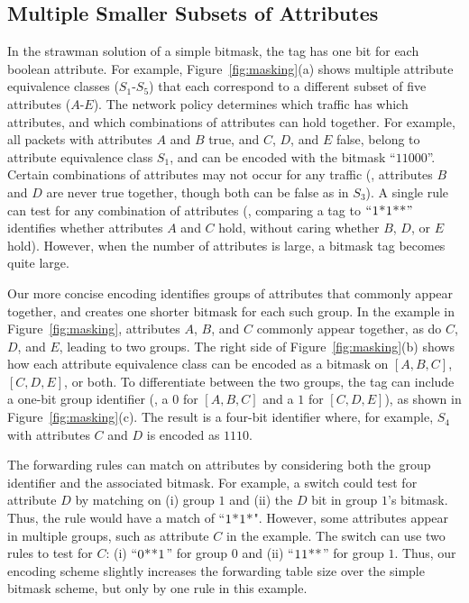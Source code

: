 \subsection{Multiple Smaller Subsets of Attributes}
\label{ssec:mset}
In the strawman solution of a simple bitmask, the tag has one bit for
each boolean attribute.  For example, Figure~\ref{fig:masking}(a)
shows multiple attribute equivalence classes ($S_1$-$S_5$) that each
correspond to a different subset of five attributes ($A$-$E$).  The
network policy determines which traffic has which attributes, and
which combinations of attributes can hold together.  For example, all
packets with attributes $A$ and $B$ true, and $C$, $D$, and $E$ false,
belong to attribute equivalence class $S_1$, and can be encoded with
the bitmask ``$11000$''.  Certain combinations of attributes may not
occur for any traffic (\eg, attributes $B$ and $D$ are never true
together, though both can be false as in $S_3$).  A single rule can
test for any combination of attributes (\eg, comparing a tag to
$\textsc{``1*1**''}$ identifies whether attributes $A$ and $C$ hold, without
caring whether $B$, $D$, or $E$ hold).  However, when the number of
attributes is large, a bitmask tag becomes quite large.

Our more concise encoding identifies groups of attributes that
commonly appear together, and creates one shorter bitmask for each
such group.  In the example in Figure~\ref{fig:masking}, attributes
$A$, $B$, and $C$ commonly appear together, as do $C$, $D$, and $E$,
leading to two groups.  The right side of Figure~\ref{fig:masking}(b)
shows how each attribute equivalence class can be encoded as a bitmask
on $[A,B,C]$, $[C,D,E]$, or both.  To differentiate between the two
groups, the tag can include a one-bit group identifier (\eg, a $0$
for $[A,B,C]$ and a $1$ for $[C,D,E]$), as shown in
Figure~\ref{fig:masking}(c).  The result is a four-bit identifier
where, for example, $S_4$ with attributes $C$ and $D$ is encoded as
$1110$.

The forwarding rules can match on attributes by considering both the
group identifier and the associated bitmask.  For example, a switch
could test for attribute $D$ by matching on (i) group $1$ and (ii) the
$D$ bit in group $1$'s bitmask.  Thus, the rule would have a match of
``$\textsc{1*1*}$".  However, some attributes appear in multiple groups, such
as attribute $C$ in the example.  The switch can use two rules to test
for $C$: (i) ``$\textsc{0**1}$'' for group $0$ and (ii) ``$\textsc{11**}$'' for group
$1$.  Thus, our encoding scheme slightly increases the forwarding
table size over the simple bitmask scheme, but only by one rule in
this example.


